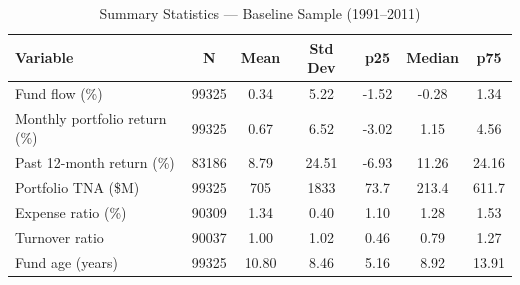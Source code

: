 \begin{table}[htbp]
\centering
\caption{Summary Statistics --- Baseline Sample (1991--2011)}
\label{tab:summary_stats_baseline}
\small
\begin{tabular}{lcccccc}
\toprule
Variable & N & Mean & Std Dev & p25 & Median & p75 \\
\midrule
Fund flow (\%) & 99325 & 0.34 & 5.22 & -1.52 & -0.28 & 1.34 \\
Monthly portfolio return (\%) & 99325 & 0.67 & 6.52 & -3.02 & 1.15 & 4.56 \\
Past 12-month return (\%) & 83186 & 8.79 & 24.51 & -6.93 & 11.26 & 24.16 \\
Portfolio TNA (\$M) & 99325 & 705 & 1833 & 73.7 & 213.4 & 611.7 \\
Expense ratio (\%) & 90309 & 1.34 & 0.40 & 1.10 & 1.28 & 1.53 \\
Turnover ratio & 90037 & 1.00 & 1.02 & 0.46 & 0.79 & 1.27 \\
Fund age (years) & 99325 & 10.80 & 8.46 & 5.16 & 8.92 & 13.91 \\
\bottomrule
\end{tabular}
\end{table}
